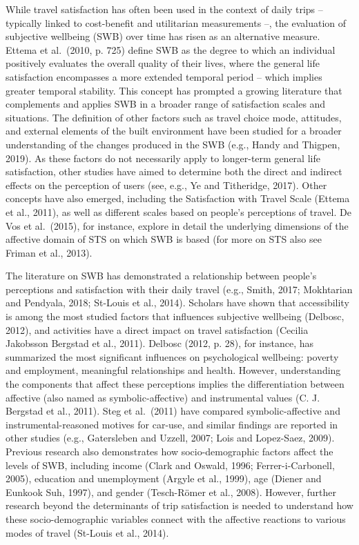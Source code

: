 \documentclass[]{elsarticle} %
\begin{document}
While travel satisfaction has often been used in the context of daily
trips -- typically linked to cost-benefit and utilitarian measurements
--, the evaluation of subjective wellbeing (SWB) over time has risen as
an alternative measure. Ettema et al.~(2010, p. 725) define SWB as the
degree to which an individual positively evaluates the overall quality
of their lives, where the general life satisfaction encompasses a more
extended temporal period -- which implies greater temporal stability.
This concept has prompted a growing literature that complements and
applies SWB in a broader range of satisfaction scales and situations.
The definition of other factors such as travel choice mode, attitudes,
and external elements of the built environment have been studied for a
broader understanding of the changes produced in the SWB (e.g., Handy
and Thigpen, 2019). As these factors do not necessarily apply to
longer-term general life satisfaction, other studies have aimed to
determine both the direct and indirect effects on the perception of
users (see, e.g., Ye and Titheridge, 2017). Other concepts have also
emerged, including the Satisfaction with Travel Scale (Ettema et al.,
2011), as well as different scales based on people's perceptions of
travel. De Vos et al.~(2015), for instance, explore in detail the
underlying dimensions of the affective domain of STS on which SWB is
based (for more on STS also see Friman et al., 2013).

The literature on SWB has demonstrated a relationship between people's
perceptions and satisfaction with their daily travel (e.g., Smith, 2017;
Mokhtarian and Pendyala, 2018; St-Louis et al., 2014). Scholars have
shown that accessibility is among the most studied factors that
influences subjective wellbeing (Delbosc, 2012), and activities have a
direct impact on travel satisfaction (Cecilia Jakobsson Bergstad et al.,
2011). Delbosc (2012, p. 28), for instance, has summarized the most
significant influences on psychological wellbeing: poverty and
employment, meaningful relationships and health. However, understanding
the components that affect these perceptions implies the differentiation
between affective (also named as symbolic-affective) and instrumental
values (C. J. Bergstad et al., 2011). Steg et al.~(2011) have compared
symbolic-affective and instrumental-reasoned motives for car-use, and
similar findings are reported in other studies (e.g., Gatersleben and
Uzzell, 2007; Lois and Lopez-Saez, 2009). Previous research also
demonstrates how socio-demographic factors affect the levels of SWB,
including income (Clark and Oswald, 1996; Ferrer-i-Carbonell, 2005),
education and unemployment (Argyle et al., 1999), age (Diener and
Eunkook Suh, 1997), and gender (Tesch-Römer et al., 2008). However,
further research beyond the determinants of trip satisfaction is needed
to understand how these socio-demographic variables connect with the
affective reactions to various modes of travel (St-Louis et al., 2014).
\end{document}
